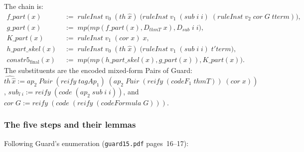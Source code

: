 \documentclass[11pt]{article}
\begin{document}
The chain is:
\begin{align*}
  f\_\mathit{part}(x) \;&:=\; \mathit{ruleInst}\;v_0\;(\mathit{th}\;\hat x)\;\big(\mathit{ruleInst}\;v_1\;(\mathit{sub}\;i\;i)\;(\mathit{ruleInst}\;v_2\;\mathit{cor}\;G\;\mathit{tterm})\big),\\
  g\_\mathit{part}(x) \;&:=\; \mathit{mp}\big(\mathit{mp}(f\_\mathit{part}(x), D_{\mathit{thmT}}\;x), D_{\mathit{sub}}\;i\;i\big),\\
  K\_\mathit{part}(x) \;&:=\; \mathit{ruleInst}\;v_1\;(\mathit{cor}\;x)\;x,\\
  h\_\mathit{part}\_\mathit{skel}(x) \;&:=\; \mathit{ruleInst}\;v_0\;(\mathit{th}\;\hat x)\;\big(\mathit{ruleInst}\;v_1\;(\mathit{sub}\;i\;i)\;\mathit{t'term}\big),\\
  \mathit{constr5}_{\mathrm{final}}(x) \;&:=\; \mathit{mp}\big(\mathit{mp}(h\_\mathit{part}\_\mathit{skel}(x), g\_\mathit{part}(x)), K\_\mathit{part}(x)\big).
\end{align*}
The substituents are the encoded mixed-form Pairs of Guard:
$\widehat{\mathit{th}\,\hat x} := \mathit{ap}_2\;\mathit{Pair}\;(\mathit{reify}\;\mathit{tagAp}_1)\;(\mathit{ap}_2\;\mathit{Pair}\;(\mathit{reify}\;(\mathit{codeF}_1\;\mathit{thmT}))\;(\mathit{cor}\;x))$,
$\mathit{sub}_i\widehat{\,}_i := \mathit{reify}\;(\mathit{code}\;(\mathit{ap}_2\;\mathit{sub}\;i\;i))$, and $\mathit{cor}\;G := \mathit{reify}\;(\mathit{code}\;(\mathit{reify}\;(\mathit{codeFormula}\;G)))$.

\subsubsection{The five steps and their lemmas}

Following Guard's enumeration (\verb|guard15.pdf| pages~16--17):
\end{document}
